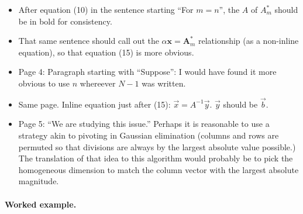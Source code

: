 \documentclass[letterpaper]{scrreprt}
\newcommand{\Bx}[0]{\mathbf{x}}
\newcommand{\BA}[0]{\mathbf{A}}
\newcommand{\conj}[0]{{*}}
\begin{document}
\begin{itemize}
\item After equation (10) in the sentence starting ``For \(m = n\)'', the \( A \) of \(A_m^\conj\) should be in bold for consistency.
\item That same sentence should call out the \( \alpha \Bx = \BA_m^\conj \) relationship (as a non-inline equation), so that equation (15) is more obvious.
\item Page 4: Paragraph starting with ``Suppose'': I would have found it more obvious to use \( n \) whereever \( N -1 \) was written.
\item Same page.  Inline equation just after (15): \( \vec{x} = A^{-1} \vec{y} \).  \( \vec{y} \) should be \( \vec{b}\).
\item Page 5: ``We are studying this issue.''  Perhaps it is reasonable to use a strategy akin to pivoting in Gaussian elimination (columns and rows are permuted so that divisions are always by the largest absolute value possible.)  The translation of that idea to this algorithm would probably be to pick the homogeneous dimension to match the column vec{t}or with the largest absolute magnitude.
\end{itemize}

\paragraph{Worked example.}
\end{document}
